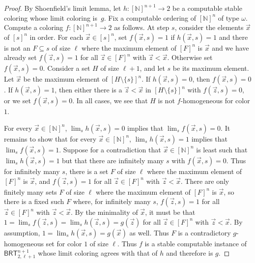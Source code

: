 \documentclass{article}
\newcommand{\BRT}[0]{\mathsf{BRT}}
\newcommand{\NN}[0]{\mathbb{N}}
\numberwithin{theorem}{section}
\newtheorem{lemma}[theorem]{Lemma}
\begin{document}
\begin{proof}
By Shoenfield's limit lemma, let $h : [\NN]^{n+1} \to 2$ be a computable stable coloring whose limit coloring is~$g$.  Fix a computable ordering of $[\NN]^n$ of type $\omega$.  Compute a coloring $f : [\NN]^{n+1} \to 2$ as follows.  At step $s$, consider the elements $\vec{x}$ of $[s]^n$ in order.  For each $\vec{x} \in [s]^n$, set $f(\vec{x}, s) = 1$ if $h(\vec{x}, s) = 1$ and there is not an $F \subseteq s$ of size $\ell$ where the maximum element of $[F]^n$ is $\vec{x}$ and we have already set $f(\vec{z}, s) = 1$ for all $\vec{z} \in [F]^n$ with $\vec{z} < \vec{x}$.  Otherwise set $f(\vec{x}, s) = 0$.  Consider a set $H$ of size $\ell+1$, and let $s$ be its maximum element.  Let $\vec{x}$ be the maximum element of $[H \setminus \{s\}]^n$.  If $h(\vec{x}, s) = 0$, then $f(\vec{x}, s) = 0$.  If $h(\vec{x}, s) = 1$, then either there is a $\vec{z} < \vec{x}$ in $[H \setminus \{s\}]^n$ with $f(\vec{z}, s) = 0$, or we set $f(\vec{x}, s) = 0$.  In all cases, we see that $H$ is not $f$-homogeneous for color $1$.

For every $\vec{x} \in [\NN]^n$, $\lim_s h(\vec{x}, s) = 0$ implies that $\lim_s f(\vec{x}, s) = 0$.  It remains to show that for every $\vec{x} \in [\NN]^n$, $\lim_s h(\vec{x}, s) = 1$ implies that $\lim_s f(\vec{x}, s) = 1$.  Suppose for a contradiction that $\vec{x} \in [\NN]^n$ is least such that $\lim_s h(\vec{x}, s) = 1$ but that there are infinitely many $s$ with $f(\vec{x}, s) = 0$.  Thus for infinitely many $s$, there is a set $F$ of size $\ell$ where the maximum element of $[F]^n$ is $\vec{x}$, and $f(\vec{z}, s) = 1$ for all $\vec{z} \in [F]^n$ with $\vec{z} < \vec{x}$.  There are only finitely many sets $F$ of size $\ell$ where the maximum element of $[F]^n$ is $\vec{x}$, so there is a fixed such $F$ where, for infinitely many $s$, $f(\vec{z}, s) = 1$ for all $\vec{z} \in [F]^n$ with $\vec{z} < \vec{x}$.  By the minimality of $\vec{x}$, it must be that $1 = \lim_s f(\vec{z}, s) = \lim_s h(\vec{z}, s) = g(\vec{z})$ for all $\vec{z} \in [F]^n$ with $\vec{z} < \vec{x}$.  By assumption, $1 = \lim_s h(\vec{x}, s) = g(\vec{x})$ as well.  Thus $F$ is a contradictory $g$-homogeneous set for color $1$ of size $\ell$.  Thus $f$ is a stable computable instance of $\BRT^{n+1}_{2, \ell+1}$ whose limit coloring agrees with that of $h$ and therefore is $g$.
\end{proof}
\end{document}
